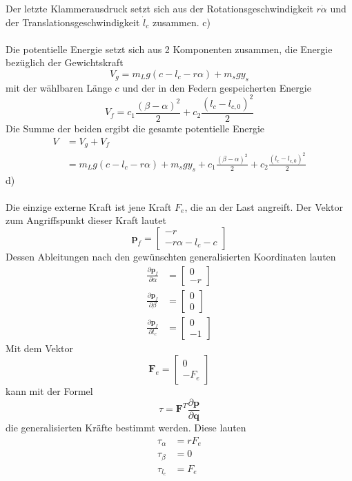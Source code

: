 Der letzte Klammerausdruck setzt sich aus der Rotationsgeschwindigkeit $r\dot{\alpha}$ und der Translationsgeschwindigkeit $\dot{l}_c$ zusammen.
\newpage
\noindent
c) \\ \\
Die potentielle Energie setzt sich aus 2 Komponenten zusammen, die Energie bezüglich der Gewichtskraft
\[
	V_g = m_Lg(c - l_c - r\alpha) + m_sgy_s
\]
mit der wählbaren Länge $c$ und der in den Federn gespeicherten Energie
\[
	V_f = c_1\frac{(\beta - \alpha)^2}{2} + c_2 \frac{(l_c - l_{c,0})^2}{2}
\]
Die Summe der beiden ergibt die gesamte potentielle Energie
\begin{align*}
	V &= V_g + V_f \\
	  &= m_Lg(c - l_c - r\alpha) + m_sgy_s + c_1\frac{(\beta - \alpha)^2}{2} + c_2 \frac{(l_c - l_{c,0})^2}{2}
\end{align*}
d) \\ \\
Die einzige externe Kraft ist jene Kraft $F_e$, die an der Last angreift. Der Vektor zum Angriffspunkt dieser Kraft lautet
\[
	\textbf{p}_f = \begin{bmatrix}
		-r \\
		-r\alpha - l_c - c
	\end{bmatrix}
\]
Dessen Ableitungen nach den gewünschten generalisierten Koordinaten lauten
\begin{align*}
	\frac{\partial \textbf{p}_f}{\partial \alpha} &= \begin{bmatrix}
		0 \\
		-r
	\end{bmatrix}
	\\
	\frac{\partial \textbf{p}_f}{\partial \beta} &= \begin{bmatrix}
		0 \\
		0
	\end{bmatrix}
	\\
	\frac{\partial \textbf{p}_f}{\partial l_c} &= \begin{bmatrix}
		0 \\
		-1
	\end{bmatrix}
\end{align*}
Mit dem Vektor
\[
	\textbf{F}_e = \begin{bmatrix}
		0 \\
		-F_e
	\end{bmatrix}
\]
kann mit der Formel
\[
	\tau = \textbf{F}^T \frac{\partial \textbf{p}}{\partial \textbf{q}}
\]
die generalisierten Kräfte bestimmt werden.
Diese lauten
\begin{align*}
	\tau_\alpha &= rF_e \\
	\tau_\beta &= 0 \\
	\tau_{l_c} &= F_e
\end{align*}
